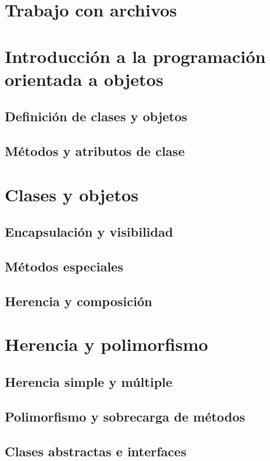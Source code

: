 \documentclass{article}
\begin{document}


\section{Trabajo con archivos}



\section{Introducción a la programación orientada a objetos}

\subsection{Definición de clases y objetos}
\subsection{Métodos y atributos de clase}

\section{Clases y objetos}

\subsection{Encapsulación y visibilidad}
\subsection{Métodos especiales}
\subsection{Herencia y composición}

\section{Herencia y polimorfismo}

\subsection{Herencia simple y múltiple}
\subsection{Polimorfismo y sobrecarga de métodos}
\subsection{Clases abstractas e interfaces}
\end{document}

